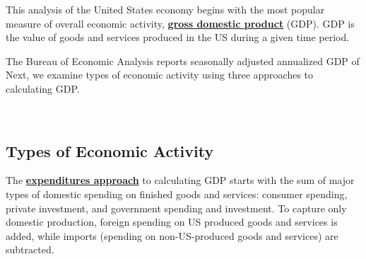 \begin{minipage}{0.56\textwidth}
\small This analysis of the United States economy begins with the most popular measure of overall economic activity, \textbf{\href{https://www.bea.gov/data/gdp/gross-domestic-product}{gross domestic product}} (GDP). GDP is the value of goods and services produced in the US during a given time period. 

The Bureau of Economic Analysis reports seasonally adjusted annualized GDP of  Next, we examine types of economic activity using three approaches to calculating GDP. 
\end{minipage}\hspace{6mm}
\begin{minipage}{0.34\textwidth}
\\
\end{minipage}

\hypertarget{oety}{\label{oety}}
\subsection*{Types of Economic Activity}
\begin{minipage}{0.76\textwidth}
\small The \textbf{\href{https://www.bea.gov/help/glossary/expenditures-approach}{expenditures approach}} to calculating GDP starts with the sum of major types of domestic spending on finished goods and services: consumer spending, private investment, and government spending and investment. To capture only domestic production, foreign spending on US produced goods and services is added, while imports (spending on non-US-produced goods and services) are subtracted.
\end{minipage}
\vspace{0.5mm}

